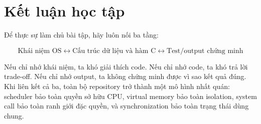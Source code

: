 \documentclass[12pt,a4paper]{article}
\begin{document}
\section{Kết luận học tập}

Để thực sự làm chủ bài tập, hãy luôn nối ba tầng:

\[
\boxed{\text{Khái niệm OS}}
\longleftrightarrow
\boxed{\text{Cấu trúc dữ liệu và hàm C}}
\longleftrightarrow
\boxed{\text{Test/output chứng minh}}
\]

Nếu chỉ nhớ khái niệm, ta khó giải thích code. Nếu chỉ nhớ code, ta khó trả lời
trade-off. Nếu chỉ nhớ output, ta không chứng minh được vì sao kết quả đúng.
Khi liên kết cả ba, toàn bộ repository trở thành một mô hình nhất quán:
scheduler bảo toàn quyền sở hữu CPU, virtual memory bảo toàn isolation, system
call bảo toàn ranh giới đặc quyền, và synchronization bảo toàn trạng thái dùng
chung.
\end{document}
